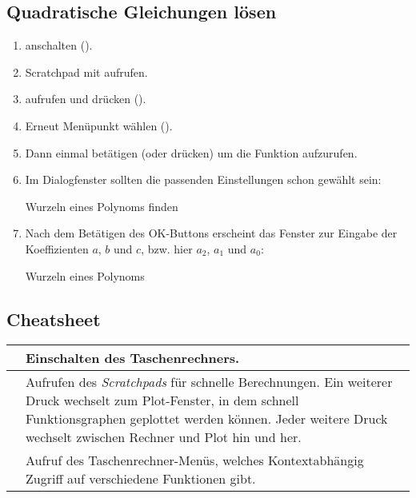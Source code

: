 \documentclass[a4paper,add-index]{cnltx-doc}
\begin{document}
\subsection{Quadratische Gleichungen lösen}
\begin{enumerate}
	\item \TIN anschalten (\TINon*).
	\item Scratchpad mit \TINscratch* aufrufen.
	\item \TINmenu* aufrufen und  drücken ().
	\item Erneut Menüpunkt  wählen ().
	\item Dann einmal \TINenter* betätigen (oder  drücken) um die Funktion  aufzurufen.
	\item Im Dialogfenster sollten die passenden Einstellungen schon gewählt sein:
	\begin{center}
		\begin{tinwindow}{Wurzeln eines Polynoms finden}
		\end{tinwindow}
	\end{center}
	\item Nach dem Betätigen des OK-Buttons erscheint das Fenster zur Eingabe der Koeffizienten $a$, $b$ und $c$, bzw. hier $a_2$, $a_1$ und $a_0$:
	\begin{center}
		\begin{tinwindow}{Wurzeln eines Polynoms}
		\end{tinwindow}
	\end{center}
\end{enumerate}

\subsection{Cheatsheet}
\begin{tabular}{|c|p{8cm}|} \hline
	\TINon* & Einschalten des Taschenrechners. \\ \hline
	\TINscratch* & Aufrufen des \emph{Scratchpads} für schnelle Berechnungen. Ein weiterer Druck wechselt zum Plot-Fenster, in dem schnell Funktionsgraphen geplottet werden können. Jeder weitere Druck wechselt zwischen Rechner und Plot hin und her. \\ \hline
	\TINmenu* & Aufruf des Taschenrechner-Menüs, welches Kontextabhängig Zugriff auf verschiedene Funktionen gibt. \\ \hline
\end{tabular}
\end{document}
